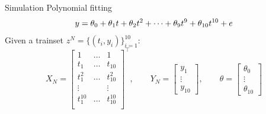\documentclass[aspectratio=169]{beamer}
\begin{document}
\begin{frame}{Simulation}
Polynomial fitting
\begin{equation*}
y = \theta_0 + \theta_1 t +  \theta_2 t^2 + \dots +  \theta_9 t^9 + \theta_{10} t^{10} + e
\vspace{10mm}
\end{equation*}
Given a trainset $z^N = \{\left(t_i,y_i\right)\}_{i=1}^{10}$:
\begin{equation*}
X_{N} = \begin{bmatrix} 
1       & \dots & 1            \\
t_1     & \dots & t_{10}          \\
t_1^2   & \dots & t_{10}^2      \\
\vdots  &       & \vdots   \\
t_1^{10}   & \dots & t_{10}^{10} \\ 
\end{bmatrix}^\top, 
\quad \quad
Y_N = \begin{bmatrix} y_1 \\ \vdots \\ y_{10} \end{bmatrix},
\quad \quad
\theta = \begin{bmatrix} \theta_0 \\ \vdots \\ \theta_{10} \end{bmatrix}
\end{equation*}

\end{frame}
\end{document}
